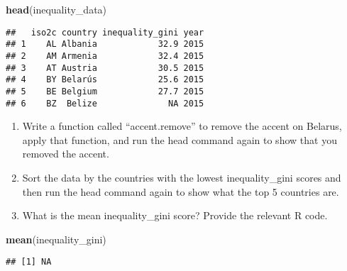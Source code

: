 \documentclass[
]{article}
\newenvironment{Shaded}{\begin{snugshade}}{\end{snugshade}}
\newcommand{\KeywordTok}[1]{\textcolor[rgb]{0.13,0.29,0.53}{\textbf{#1}}}
\newcommand{\NormalTok}[1]{#1}
\begin{document}
\begin{Shaded}
\begin{Highlighting}[]
\KeywordTok{head}\NormalTok{(inequality_data)}
\end{Highlighting}
\end{Shaded}

\begin{verbatim}
##   iso2c country inequality_gini year
## 1    AL Albania            32.9 2015
## 2    AM Armenia            32.4 2015
## 3    AT Austria            30.5 2015
## 4    BY Belarús            25.6 2015
## 5    BE Belgium            27.7 2015
## 6    BZ  Belize              NA 2015
\end{verbatim}

\begin{enumerate}
\def\labelenumi{\arabic{enumi}.}
\setcounter{enumi}{7}
\item
  Write a function called ``accent.remove'' to remove the accent on
  Belarus, apply that function, and run the head command again to show
  that you removed the accent.
\item
  Sort the data by the countries with the lowest inequality\_gini scores
  and then run the head command again to show what the top 5 countries
  are.
\item
  What is the mean inequality\_gini score? Provide the relevant R code.
\end{enumerate}

\begin{Shaded}
\begin{Highlighting}[]
\KeywordTok{mean}\NormalTok{(inequality_gini)}
\end{Highlighting}
\end{Shaded}

\begin{verbatim}
## [1] NA
\end{verbatim}
\end{document}
